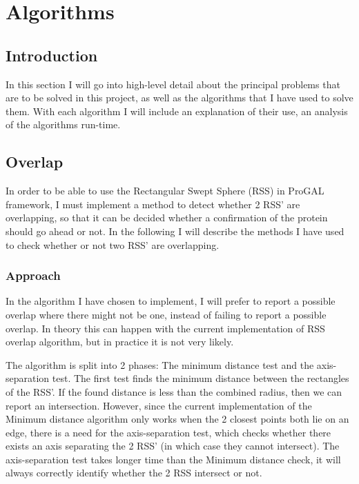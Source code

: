 
\section{Algorithms}
\label{algorithms}

\subsection{Introduction}
In this section I will go into high-level detail about the principal problems that are to be solved in this project, as well as the algorithms that I have used to solve them. With each algorithm I will include an explanation of their use, an analysis of the algorithms run-time. 

\subsection{Overlap}
\label{overlap}
In order to be able to use the Rectangular Swept Sphere (RSS) in ProGAL framework, I must implement a method to detect whether 2 RSS' are overlapping, so that it can be decided whether a confirmation of the protein should go ahead or not. In the following I will describe the methods I have used to check whether or not two RSS' are overlapping.

\subsubsection{Approach}
In the algorithm I have chosen to implement, I will prefer to report a possible overlap where there might not be one, instead of failing to report a possible overlap. In theory this can happen with the current implementation of RSS overlap algorithm, but in practice it is not very likely.

The algorithm is split into 2 phases: The minimum distance test and the axis-separation test. The first test finds the minimum distance between the rectangles of the RSS'. If the found distance is less than the combined radius, then we can report an intersection. However, since the current implementation of the Minimum distance algorithm only works when the 2 closest  points both lie on an edge, there is a need for the axis-separation test, which checks whether there exists an axis separating the 2 RSS' (in which case they cannot intersect). The axis-separation test takes longer time than the Minimum distance check, it will always correctly identify whether the 2 RSS intersect or not.

